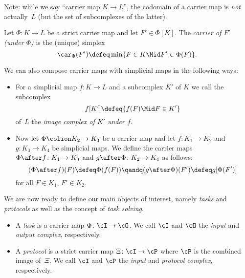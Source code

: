 Note: while we say \enquote{carrier map $K\to L$}, the codomain of a carrier map
is \emph{not} actually~$L$ (but the set of subcomplexes of the latter).

\begin{thDef}[carrier]
    Let $\Phi\colon K\to L$ be a strict carrier map and let $F'\in\Phi[K]$.
    The \emph{carrier of $F'$ (under $\Phi$)} is the (unique) simplex
    \[ \car_\Phi(F') \defeq \min \{ F \in K \Mid F'\in\Phi(F) \}  . \]
\end{thDef}

We can also compose carrier maps with simplicial maps in the following ways:

\begin{thDef}
    \begin{itemize}
        \item
            For a simplicial map $f\colon K\to L$ and a subcomplex $K'$ of
            $K$ we call the subcomplex
            \[ f[K'] \defeq \{ f(F) \Mid F\in K' \} \]
            of~$L$ the \emph{image complex of $K'$ under $f$}.
            
        \item
            Now let $\Phi\colion K_2\to K_3$ be a carrier map and let
            $f\colon K_1\to K_2$ and $g\colon K_3\to K_4$ be simplicial
            maps. We define the carrier maps
            $\Phi\after f\colon K_1\to K_3$ and $g\after\Phi\colon K_2\to K_4$
            as follows:
            \[ (\Phi\after f)(F) \defeq \Phi(f(F))
                \qandq
                (g\after \Phi)(F') \defeq g[\Phi(F')]
            \]
            for all $F\in K_1$, $F'\in K_2$.
    \end{itemize}
\end{thDef}

We are now ready to define our main objects of interest, namely \emph{tasks}
and \emph{protocols} as well as the concept of \emph{task solving}.

\begin{thDef}
    \label{ch1:def:taskprotocol}
    \begin{itemize}
        \item
            A \emph{task} is a carrier map $\Phi\colon\cI\to\cO$.
            We call $\cI$ and $\cO$ the \emph{input} and \emph{output complex},
            respectively.
            
        \item
            A \emph{protocol} is a strict carrier map $\Xi\colon\cI\to\cP$
            where $\cP$ is the combined image of~$\Xi$.
            We call $\cI$ and $\cP$ the \emph{input} and \emph{protocol
            complex}, respectively.
    \end{itemize}
\end{thDef}

